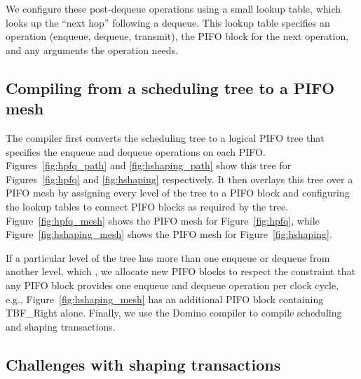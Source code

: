 We configure these post-dequeue operations using a small lookup table, which
looks up the ``next hop'' following a dequeue. This lookup table specifies an
operation (enqueue, dequeue, transmit), the PIFO block for the next operation,
and any arguments the operation needs.

\subsection{Compiling from a scheduling tree to a PIFO mesh}
\label{ss:compiler}


The compiler first converts the scheduling tree to a logical PIFO tree that
specifies the enqueue and dequeue operations on each PIFO.
Figures~\ref{fig:hpfq_path} and \ref{fig:hshaping_path} show this tree for
Figures~\ref{fig:hpfq} and \ref{fig:hshaping} respectively.  It then overlays
this tree over a PIFO mesh by assigning every level of the tree to a PIFO block
and configuring the lookup tables to connect PIFO blocks as required by the
tree.  Figure~\ref{fig:hpfq_mesh} shows the PIFO mesh for
Figure~\ref{fig:hpfq}, while Figure~\ref{fig:hshaping_mesh} shows the PIFO mesh
for Figure~\ref{fig:hshaping}.

If a particular level of the tree has more than one enqueue or dequeue from
another level, which , we allocate new PIFO blocks to respect the
constraint that any PIFO block provides one enqueue and dequeue operation per
clock cycle, e.g., Figure~\ref{fig:hshaping_mesh} has an additional PIFO block
containing TBF\_Right alone. Finally, we use the Domino compiler to compile
scheduling and shaping transactions.


\subsection{Challenges with shaping transactions}
\label{ss:shape_challenge}

